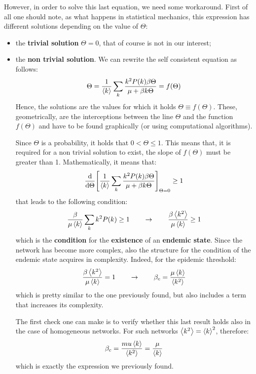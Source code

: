 \documentclass[../main/main.tex]{subfiles}
\begin{document}
However, in order to solve this last equation, we need some workaround. First of all one should note, as what happens in statistical mechanics, this expression has different solutions depending on the value of $\Theta$:
\begin{itemize}
\item the \textbf{trivial solution} \( \Theta =0 \), that of course is not in our interest;
\item the \textbf{non trivial solution}. We can rewrite the self consistent equation as follows:
\begin{equation*}
   \Theta = \frac{1}{\expval{k} } \sum_{k}^{} \frac{k^2 P(k) \beta \Theta }{\mu + \beta k \Theta } = f(\Theta )
\end{equation*}
Hence, the solutions are the values for which it holds \( \Theta \equiv f(\Theta )\). These, geometrically, are the interceptions between the line \( \Theta  \) and the function \( f(\Theta ) \) and have to be found graphically (or using computational algorithms).

Since \( \Theta  \) is a probability, it holds that \( 0<\Theta \le 1 \). This means that, it is required for a non trivial solution to exist, the slope of \( f(\Theta ) \) must be greater than 1.
Mathematically, it means that:
\begin{equation*}
  \dv{}{\Theta }  \qty[ \frac{1}{\expval{k} } \sum_{k}^{} \frac{k^2 P(k) \beta \Theta }{\mu + \beta k \Theta } ]_{\Theta =0} \ge 1
\end{equation*}
that leads to the following condition:
\begin{equation}
\frac{\beta }{\mu \expval{k} } \sum_{k}^{}k^2 P(k) \ge 1 \qquad \rightarrow  \qquad \frac{\beta \expval{k^2} }{\mu \expval{k} } \ge 1
\end{equation}
which is the \textbf{condition} for the \textbf{existence} of an \textbf{endemic state}. Since the network has become more complex, also the structure for the condition of the endemic state acquires in complexity. Indeed, for the epidemic threshold:
\begin{equation}
 \frac{\beta \expval{k^2} }{\mu \expval{k} } = 1 \qquad \rightarrow \qquad \beta _c = \frac{\mu \expval{k} }{\expval{k^2} }
\end{equation}
which is pretty similar to the one previously found, but also includes a term that increases its complexity.

The first check one can make is to verify whether this last result holds also in the case of homogeneous networks. For such networks \( \expval{k^2} = \expval{k}^2   \), therefore:
\begin{equation*}
  \beta _c = \frac{mu \expval{k} }{\expval{k^2} } = \frac{\mu }{\expval{k} }
\end{equation*}
which is exactly the expression we previously found.

\end{itemize}
\end{document}
